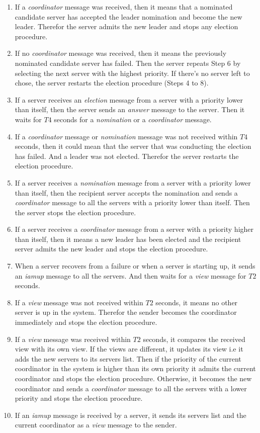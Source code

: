 \documentclass[dareport.tex]{subfiles}
\begin{document}
\begin{enumerate}[leftmargin=*]
	\item If a \emph{coordinator} message was received, then it means that a nominated candidate server has accepted the leader nomination and become the new leader. Therefor the server admits the new leader and stops any election procedure.
	\item If no \emph{coordinator} message was received, then it means the previously nominated candidate server has failed. Then the server repeats Step 6 by selecting the next server with the highest priority. If there's no server left to chose, the server restarts the election procedure (Steps 4 to 8).
	\item If a server receives an \emph{election} message from a server with a priority lower than itself, then the server sends an \emph{answer} message to the server. Then it waits for $ T4 $ seconds for a \emph{nomination} or a \emph{coordinator} message.
	\item If a \emph{coordinator} message or \emph{nomination} message was not received within $ T4 $ seconds, then it could mean that the server that was conducting the election has failed. And a leader was not elected. Therefor the server restarts the election procedure.
	\item If a server receives a \emph{nomination} message from a server with a priority lower than itself, then the recipient server accepts the nomination and sends a \emph{coordinator} message to all the servers with a priority lower than itself. Then the server stops the election procedure.
	\item If a server receives a \emph{coordinator} message from a server with a priority higher than itself, then it means a new leader has been elected and the recipient server admits the new leader and stops the election procedure.
	\item When a server recovers from a failure or when a server is starting up, it sends an \emph{iamup} message to all the servers. And then waits for a \emph{view} message for $ T2 $ seconds.
	\item If a \emph{view} message was not received within $ T2 $ seconds, it means no other server is up in the system. Therefor the sender becomes the coordinator immediately and stops the election procedure.
	\item If a \emph{view} message was received within $ T2 $ seconds, it compares the received view with its own view. If the views are different, it updates its view i.e it adds the new servers to its servers list. Then if the priority of the current coordinator in the system is higher than its own priority it admits the current coordinator and stops the election procedure. Otherwise, it becomes the new coordinator and sends a \emph{coordinator} message to all the servers with a lower priority and stops the election procedure.
	\item If an \emph{iamup} message is received by a server, it sends its servers list and the current coordinator as a \emph{view} message to the sender.
\end{enumerate}
\end{document}
